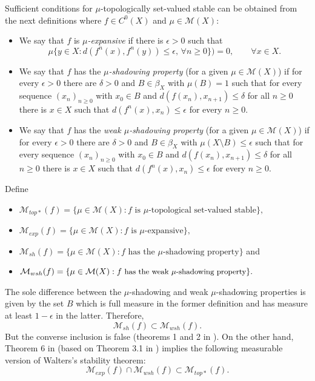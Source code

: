 \documentclass[11pt,letterpaper]{amsart}
\theoremstyle{plain}
\begin{document}
Sufficient conditions for $\mu$-topologically set-valued stable can be obtained from the next definitions where $f\in C^0(X)$ and $\mu\in\mathcal{M}(X)$:

\begin{itemize}
\item
We say that $f$ is {\em $\mu$-expansive} if there is $\epsilon>0$
such that
$$
\mu\{y\in X:d(f^n(x),f^n(y))\leq\epsilon,\,\forall n\geq0\})=0,\quad\quad\forall x\in X.
$$
\item
We say that $f$ has the {\em $\mu$-shadowing property}
(for a given $\mu\in\mathcal{M}(X)$) if for every $\epsilon>0$ there are $\delta>0$ and $B\in\beta_X$ with $\mu(B)=1$ such that for every sequence $(x_n)_{n\geq0}$ with $x_0\in B$ and $d(f(x_n),x_{n+1})\leq\delta$ for all $n\geq0$ there is $x\in X$ such that
$d(f^n(x),x_n)\leq \epsilon$ for every $n\geq 0$.
\item
We say that $f$ has the {\em weak $\mu$-shadowing property}
(for a given $\mu\in\mathcal{M}(X)$) if for every $\epsilon>0$ there are $\delta>0$ and $B\in\beta_X$ with $\mu(X\setminus B)\leq \epsilon$ such that for every sequence $(x_n)_{n\geq0}$ with $x_0\in B$ and $d(f(x_n),x_{n+1})\leq\delta$ for all $n\geq0$ there is $x\in X$ such that
$d(f^n(x),x_n)\leq \epsilon$ for every $n\geq 0$.
\end{itemize}

Define
\begin{itemize}
\item
$
\mathcal{M}_{top*}(f)=\{\mu\in\mathcal{M}(X):f\mbox{ is $\mu$-topological set-valued stable}\},
$
\item
$
\mathcal{M}_{exp}(f)=\{\mu\in\mathcal{M}(X):f\mbox{ is $\mu$-expansive}\},
$
\item
$
\mathcal{M}_{sh}(f)=\{\mu\in\mathcal{M}(X):f\mbox{ has the $\mu$-shadowing property}\}
$
and
\item
$
{\small \mathcal{M}_{wsh}(f)=\{\mu\in\mathcal{M}(X):f\mbox{ has the weak $\mu$-shadowing property}\}}.
$
\end{itemize}

The sole difference between the $\mu$-shadowing and weak $\mu$-shadowing properties is given by the set $B$ which is full measure in the former definition and has measure at least $1-\epsilon$ in the latter.
Therefore, 
$$
\mathcal{M}_{sh}(f)\subset \mathcal{M}_{wsh}(f).
$$
But the converse inclusion is false (theorems 1 and 2 in \cite{lr}).
On the other hand, Theorem 6 in \cite{lr} (based on Theorem 3.1 in \cite{lm})
implies the following measurable version of Walters's stability theorem:
\begin{equation}
\label{litt}
\mathcal{M}_{exp}(f)\cap \mathcal{M}_{wsh}(f)\subset \mathcal{M}_{top*}(f).
\end{equation}
\end{document}
